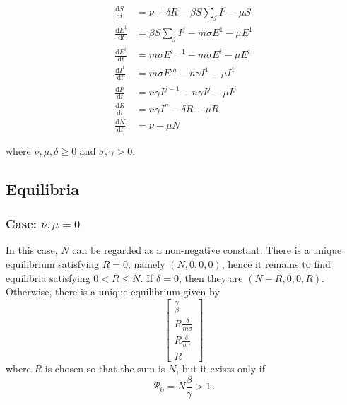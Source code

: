 \documentclass[fleqn]{article}
\begin{document}
\begin{subequations}
\begin{align}
  \frac{\text{d} S    }{\text{d} t}
  &= \nu + \delta R - \beta S \sum\nolimits_{j} I^{j} - \mu S \\
  \frac{\text{d} E^{1}}{\text{d} t}
  &= \beta S \sum\nolimits_{j} I^{j} - m \sigma E^{1} - \mu E^{1} \\
  \frac{\text{d} E^{i}}{\text{d} t}
  &= m \sigma E^{i-1} - m \sigma E^{i} - \mu E^{i} \\
  \frac{\text{d} I^{1}}{\text{d} t}
  &= m \sigma E^{m} - n \gamma I^{1} - \mu I^{1} \\
  \frac{\text{d} I^{j}}{\text{d} t}
  &= n \gamma I^{j-1} - n \gamma I^{j} - \mu I^{j} \\
  \frac{\text{d} R    }{\text{d} t}
  &= n \gamma I^{n} - \delta R - \mu R \\
  \frac{\text{d} N    }{\text{d} t}
  &= \nu - \mu N
\end{align}
\end{subequations}

where $\nu,\mu,\delta \geq 0$ and $\sigma,\gamma > 0$.

\subsection{Equilibria}

\subsubsection{Case: $\nu, \mu = 0$}

In this case, $N$ can be regarded as a non-negative constant.
There is a unique equilibrium satisfying $R = 0$,
namely $(N, 0, 0, 0)$,
hence it remains to find equilibria satisfying $0 < R \leq N$.
If $\delta = 0$, then they are $(N - R, 0, 0, R)$.
Otherwise, there is a unique equilibrium given by
\begin{equation}
\begin{bmatrix}
  \frac{\gamma}{\beta} \\
  R \frac{\delta}{m \sigma} \\
  R \frac{\delta}{n \gamma} \\
  R
\end{bmatrix}
\end{equation}
where $R$ is chosen so that the sum is $N$, but it exists only if
\begin{equation}
\mathcal{R}_{0} = N \frac{\beta}{\gamma} > 1\,.
\end{equation}
\end{document}

